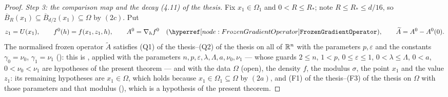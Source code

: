 \begin{proof}
\emph{Step 3: the comparison map and the decay (4.11) of the thesis.}  Fix
$x_1\in\Omega_1$ and $0<R\le R_\ast$; note $R\le R_\ast\le d/16$, so
$\overline B_R(x_1)\subseteq\overline B_{d/2}(x_1)\subseteq\Omega$ by $(2c)$.
Put
\[
z_1=U(x_1),\qquad f^0(h)=f(x_1,z_1,h),\qquad
A^0=\nabla_hf^0\quad(\noderef{FrozenGradientOperator}),\qquad
\widetilde A=A^0-A^0(0).
\]
The normalised frozen operator $\widetilde A$ satisfies
(Q1) of the thesis--(Q2) of the thesis on all of $\mathbb{R}^n$ with the parameters
$p,\varepsilon$ and the constants $\gamma_0=\nu_0$, $\gamma_1=\nu_1$
(): this is ,
applied with the parameters $n,p,\varepsilon,\lambda,\Lambda,a,\nu_0,\nu_1$ ---
whose guards $2\le n$, $1<p$, $0\le\varepsilon\le1$, $0<\lambda\le\Lambda$,
$0<a$, $0<\nu_0<\nu_1$ are hypotheses of the present theorem --- and with the
data $\Omega$ (open), the density $f$, the modulus $\sigma$, the point $x_1$ and
the value $z_1$: its remaining hypotheses are $x_1\in\Omega$, which holds
because $x_1\in\Omega_1\subseteq\Omega$ by $(2a)$, and
(F1) of the thesis--(F3) of the thesis on $\Omega$ with those parameters and that modulus
(), which is a hypothesis of the present
theorem.


\end{proof}
